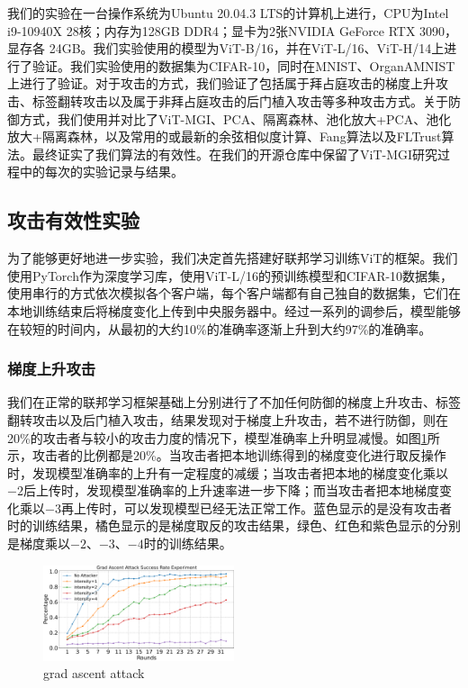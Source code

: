 \documentclass[conference]{IEEEtran}
\def\figGradAscentAttack{0.5\textwidth}
\begin{document}
我们的实验在一台操作系统为Ubuntu 20.04.3 LTS的计算机上进行，CPU为Intel i9-10940X 28核；内存为128GB DDR4；显卡为2张NVIDIA GeForce RTX 3090，显存各 24GB。我们实验使用的模型为ViT-B/16，并在ViT-L/16、ViT-H/14上进行了验证。我们实验使用的数据集为CIFAR-10，同时在MNIST、OrganAMNIST上进行了验证。对于攻击的方式，我们验证了包括属于拜占庭攻击的梯度上升攻击、标签翻转攻击以及属于非拜占庭攻击的后门植入攻击等多种攻击方式。关于防御方式，我们使用并对比了ViT-MGI、PCA、隔离森林、池化放大\cite{betterTogether}+PCA、池化放大+隔离森林，以及常用的或最新的余弦相似度计算、Fang算法以及FLTrust算法。最终证实了我们算法的有效性。在我们的开源仓库中保留了ViT-MGI研究过程中的每次的实验记录与结果。

\subsection{攻击有效性实验}
\label{exp:attack}

为了能够更好地进一步实验，我们决定首先搭建好联邦学习训练ViT的框架。我们使用PyTorch作为深度学习库，使用ViT-L/16的预训练模型和CIFAR-10数据集，使用串行的方式依次模拟各个客户端，每个客户端都有自己独自的数据集，它们在本地训练结束后将梯度变化上传到中央服务器中。经过一系列的调参后，模型能够在较短的时间内，从最初的大约10\%的准确率逐渐上升到大约97\%的准确率。

\subsubsection{\textbf{梯度上升攻击}}
\label{exp:attack:grad}

我们在正常的联邦学习框架基础上分别进行了不加任何防御的梯度上升攻击、标签翻转攻击以及后门植入攻击，结果发现对于梯度上升攻击，若不进行防御，则在20\%的攻击者与较小的攻击力度的情况下，模型准确率上升明显减慢。如图\hyperref[fig:gradAscent]{\ref{fig:gradAscent}}所示，攻击者的比例都是20\%。当攻击者把本地训练得到的梯度变化进行取反操作时，发现模型准确率的上升有一定程度的减缓；当攻击者把本地的梯度变化乘以$-2$后上传时，发现模型准确率的上升速率进一步下降；而当攻击者把本地梯度变化乘以$-3$再上传时，可以发现模型已经无法正常工作。蓝色显示的是没有攻击者时的训练结果，橘色显示的是梯度取反的攻击结果，绿色、红色和紫色显示的分别是梯度乘以$-2$、$-3$、$-4$时的训练结果。

\begin{figure}[htbp]
    \centerline{\includegraphics[width=\figGradAscentAttack]{pics/001-gradAttack-attackRate.pdf}}
    \caption{grad ascent attack}
    \label{fig:gradAscent}
\end{figure}
\end{document}
